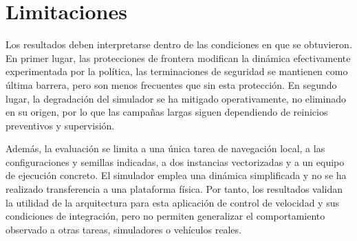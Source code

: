 \section{Limitaciones} \label{sct:resultados:limitaciones}

Los resultados deben interpretarse dentro de las condiciones en que se
obtuvieron. En primer lugar, las protecciones de frontera modifican la dinámica
efectivamente experimentada por la política, las terminaciones de seguridad se
mantienen como última barrera, pero son menos frecuentes que sin esta
protección. En segundo lugar, la degradación del simulador se ha mitigado
operativamente, no eliminado en su origen, por lo que las campañas largas siguen
dependiendo de reinicios preventivos y supervisión.

Además, la evaluación se limita a una única tarea de navegación local, a las
configuraciones y semillas indicadas, a dos instancias vectorizadas y a un equipo
de ejecución concreto. El simulador emplea una dinámica simplificada y no se ha
realizado transferencia a una plataforma física. Por tanto, los resultados
validan la utilidad de la arquitectura para esta aplicación de control de velocidad y
sus condiciones de integración, pero no permiten generalizar el comportamiento
observado a otras tareas, simuladores o vehículos reales.
